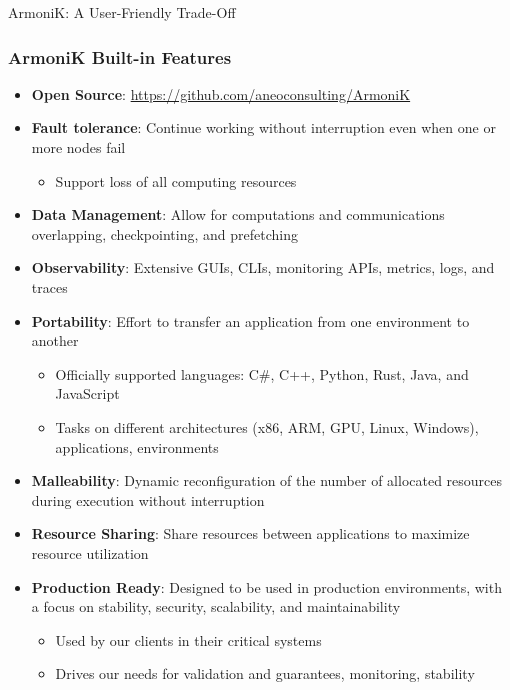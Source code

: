 \documentclass[10pt,aspectratio=1609]{beamer}
\begin{document}
\begin{section}{ArmoniK: A User-Friendly Trade-Off}
 \begin{frame}
   \frametitle{ArmoniK Built-in Features}
   \begin{itemize}
     \item \textbf{Open Source}: \url{https://github.com/aneoconsulting/ArmoniK}
     \item \textbf{Fault tolerance}: Continue working without interruption even when one or more nodes fail
           \begin{itemize}
             \item Support loss of all computing resources
           \end{itemize}
     \item \textbf{Data Management}: Allow for computations and communications overlapping, checkpointing, and prefetching
     \item \textbf{Observability}: Extensive GUIs, CLIs, monitoring APIs, metrics, logs, and traces
     \item \textbf{Portability}: Effort to transfer an application from one environment to another
           \begin{itemize}
             \item Officially supported languages: C\#, C++, Python, Rust, Java, and JavaScript
             \item Tasks on different architectures (x86, ARM, GPU, Linux, Windows), applications, environments
           \end{itemize}
     \item \textbf{Malleability}: Dynamic reconfiguration of the number of allocated resources during execution without interruption
     \item \textbf{Resource Sharing}: Share resources between applications to maximize resource utilization
     \item \textbf{Production Ready}: Designed to be used in production environments, with a focus on stability, security, scalability, and maintainability
           \begin{itemize}
             \item Used by our clients in their critical systems
             \item Drives our needs for validation and guarantees, monitoring, stability
           \end{itemize}
   \end{itemize}
 \end{frame}
\end{section}
\end{document}
